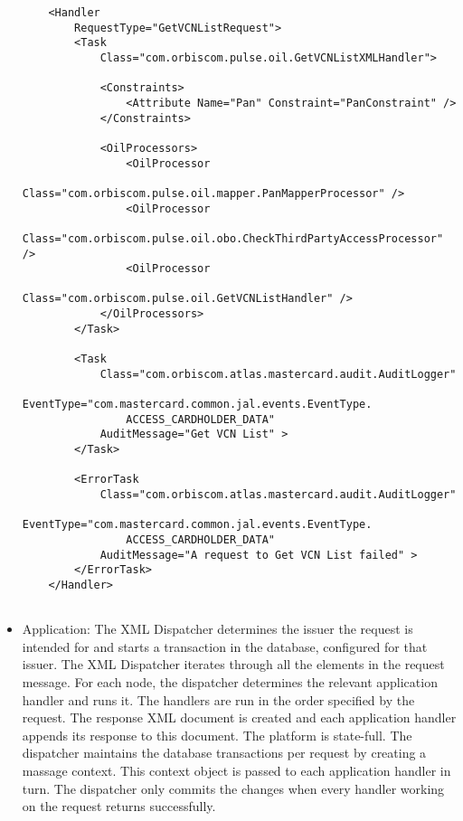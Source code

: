 \documentclass[a4paper, 11pt, titlepage]{article}
\begin{document}
\begin{itemize}
\begin{verbatim}
    <Handler 
        RequestType="GetVCNListRequest"> 
        <Task 
            Class="com.orbiscom.pulse.oil.GetVCNListXMLHandler"> 
 
            <Constraints> 
                <Attribute Name="Pan" Constraint="PanConstraint" /> 
            </Constraints> 
 
            <OilProcessors> 
                <OilProcessor 
                    Class="com.orbiscom.pulse.oil.mapper.PanMapperProcessor" /> 
                <OilProcessor 
                    Class="com.orbiscom.pulse.oil.obo.CheckThirdPartyAccessProcessor" /> 
                <OilProcessor 
                    Class="com.orbiscom.pulse.oil.GetVCNListHandler" /> 
            </OilProcessors> 
        </Task> 
 
        <Task 
            Class="com.orbiscom.atlas.mastercard.audit.AuditLogger" 
                EventType="com.mastercard.common.jal.events.EventType.
                ACCESS_CARDHOLDER_DATA" 
            AuditMessage="Get VCN List" > 
        </Task> 
         
        <ErrorTask 
            Class="com.orbiscom.atlas.mastercard.audit.AuditLogger" 
                EventType="com.mastercard.common.jal.events.EventType.
                ACCESS_CARDHOLDER_DATA" 
            AuditMessage="A request to Get VCN List failed" > 
        </ErrorTask> 
    </Handler> 
 
\end{verbatim} 
\item Application: The XML Dispatcher determines the issuer the request is intended for and starts a transaction in the database, configured for that issuer. The XML Dispatcher iterates through all the elements in the request message. For each node, the dispatcher determines the relevant application handler and runs it. The handlers are run in the order specified by the request. The response XML document is created and each application handler appends its response to this document. 
The platform is state-full. The dispatcher maintains the database transactions per request by creating a massage context. This context object is passed to each application handler in turn. The dispatcher only commits the changes when every handler working on the request returns successfully. \label{context}


\end{itemize}
\end{document}
